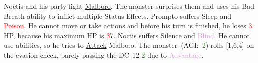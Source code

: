 %
\vspace*{0.5cm}
%
{
Noctis and his party fight \hyperlink{malboro}{Malboro}. 
The monster surprises them and uses his Bad Breath ability to inflict multiple Status Effects.
Prompto suffers Sleep and \textcolor{red}{Poison}. 
He cannot move or take actions and before his turn is finished, he loses \textcolor{red}{3} HP, because his maximum HP is 
\textcolor{red}{3}7.
Noctis suffers Silence and \textcolor{Plum}{Blind}.
He cannot use abilities, so he tries to \hyperlink{action}{Attack} Malboro. 
The monster~(AGI:~\textcolor{ForestGreen}{2}) rolls [1,6,4] on the evasion check, barely passing the 
\mbox{DC 12-\textcolor{ForestGreen}{2}} due to \textcolor{Plum}{Advantage}.
}
%
\pagebreak








